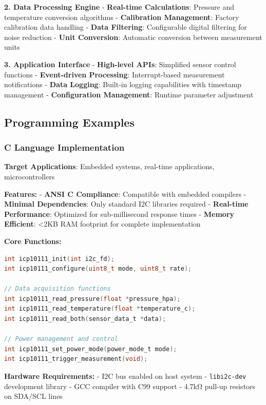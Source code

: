 \documentclass[11pt,a4paper]{article}
\begin{document}
\textbf{2. Data Processing Engine}
- \textbf{Real-time Calculations}: Pressure and temperature conversion algorithms
- \textbf{Calibration Management}: Factory calibration data handling
- \textbf{Data Filtering}: Configurable digital filtering for noise reduction
- \textbf{Unit Conversion}: Automatic conversion between measurement units

\textbf{3. Application Interface}
- \textbf{High-level APIs}: Simplified sensor control functions
- \textbf{Event-driven Processing}: Interrupt-based measurement notifications
- \textbf{Data Logging}: Built-in logging capabilities with timestamp management
- \textbf{Configuration Management}: Runtime parameter adjustment

\subsection{Programming Examples}

\subsubsection{C Language Implementation}

\textbf{Target Applications}: Embedded systems, real-time applications, microcontrollers

\textbf{Features:}
- \textbf{ANSI C Compliance}: Compatible with embedded compilers
- \textbf{Minimal Dependencies}: Only standard I2C libraries required
- \textbf{Real-time Performance}: Optimized for sub-millisecond response times
- \textbf{Memory Efficient}: <2KB RAM footprint for complete implementation

\textbf{Core Functions:}
\begin{lstlisting}[language=c]
int icp10111_init(int i2c_fd);                    
int icp10111_configure(uint8_t mode, uint8_t rate);

// Data acquisition functions  
int icp10111_read_pressure(float *pressure_hpa);      
int icp10111_read_temperature(float *temperature_c); 
int icp10111_read_both(sensor_data_t *data);

// Power management and control
int icp10111_set_power_mode(power_mode_t mode);
int icp10111_trigger_measurement(void);
\end{lstlisting}

\textbf{Hardware Requirements:}
- I2C bus enabled on host system
- \texttt{\footnotesize libi2c-dev} development library
- GCC compiler with C99 support
- 4.7kΩ pull-up resistors on SDA/SCL lines
\end{document}
